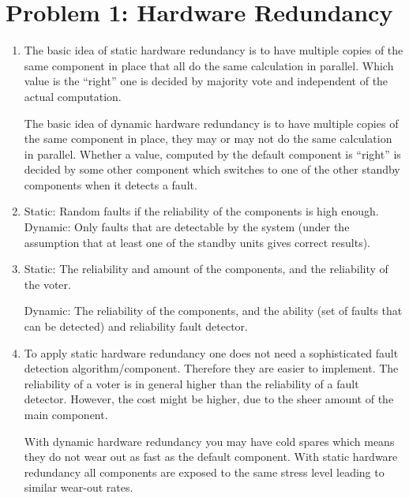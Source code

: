 \documentclass[a4paper,parskip,headheight=38pt]{scrartcl} %
\begin{document}
\section*{Problem 1: Hardware Redundancy}
\begin{enumerate}
\item The basic idea of static hardware redundancy is to have multiple copies of the same component in place that all do the same calculation in parallel. Which value is the \enquote{right} one is decided by majority vote and independent of the actual computation.

The basic idea of dynamic hardware redundancy is to have multiple copies of the same component in place, they may or may not do the same calculation in parallel. Whether a value, computed by the default component is \enquote{right} is decided by some other component which switches to one of the other standby components when it detects a fault.

\item Static: Random faults if the reliability of the components is high enough. Dynamic: Only faults that are detectable by the system (under the assumption that at least one of the standby units gives correct results).

\item Static: The reliability and amount of the components, and the reliability of the voter.

Dynamic: The reliability of the components, and the ability (set of faults that can be detected) and reliability fault detector.

\item To apply static hardware redundancy one does not need a sophisticated fault detection algorithm/component. Therefore they are easier to implement. The reliability of a voter is in general higher than the reliability of a fault detector. However, the cost might be higher, due to the sheer amount of the main component.

With dynamic hardware redundancy you may have cold spares which means they do not wear out as fast as the default component. With static hardware redundancy all components are exposed to the same stress level leading to similar wear-out rates.
\end{enumerate}
\end{document}
